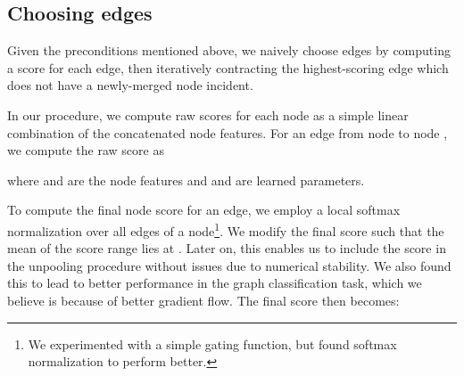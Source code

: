 \documentclass{article}
\begin{document}
\subsection{Choosing edges}

Given the preconditions mentioned above, we naively choose edges by computing a score for each edge, then iteratively contracting the highest-scoring edge which does not have a newly-merged node incident.

In our procedure, we compute raw scores for each node as a simple linear combination of the concatenated node features. For an edge from node  to node , we compute the raw score  as 



where  and  are the node features and  and  are learned parameters.

To compute the final node score  for an edge, we employ a local softmax normalization over all edges of a node\footnote{We experimented with a simple  gating function, but found softmax normalization to perform better.}. We modify the final score such that the mean of the score range lies at . Later on, this enables us to include the score in the unpooling procedure without issues due to numerical stability. We also found this to lead to better performance in the graph classification task, which we believe is because of better gradient flow. The final score then becomes:
\end{document}

